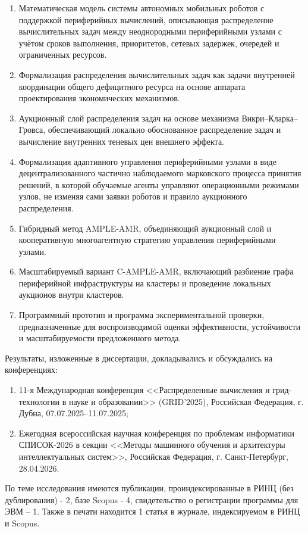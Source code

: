 \begin{enumerate}
    \item Математическая модель системы автономных мобильных роботов с поддержкой периферийных вычислений, описывающая распределение вычислительных задач между неоднородными периферийными узлами с учётом сроков выполнения, приоритетов, сетевых задержек, очередей и ограниченных ресурсов.
	\item Формализация распределения вычислительных задач как задачи внутренней координации общего дефицитного ресурса на основе аппарата проектирования экономических механизмов.
	\item Аукционный слой распределения задач на основе механизма Викри--Кларка--Гровса, обеспечивающий локально обоснованное распределение задач и вычисление внутренних теневых цен внешнего эффекта.
	\item Формализация адаптивного управления периферийными узлами в виде децентрализованного частично наблюдаемого марковского процесса принятия решений, в которой обучаемые агенты управляют операционными режимами узлов, не изменяя сами заявки роботов и правило аукционного распределения.
	\item Гибридный метод AMPLE-AMR, объединяющий аукционный слой и кооперативную многоагентную стратегию управления периферийными узлами.
	\item Масштабируемый вариант C-AMPLE-AMR, включающий разбиение графа периферийной инфраструктуры на кластеры и проведение локальных аукционов внутри кластеров.
	\item Программный прототип и программа экспериментальной проверки, предназначенные для воспроизводимой оценки эффективности, устойчивости и масштабируемости предложенного метода.
\end{enumerate}

\probation Результаты, изложенные в диссертации, докладывались и обсуждались на конференциях:
\begin{enumerate}
	\item 11-я Международная конференция <<Распределенные вычисления и грид-технологии в науке и образовании>> (GRID'2025), Российская Федерация, г. Дубна, 07.07.2025–11.07.2025;
	\item Ежегодная всероссийская научная конференция по проблемам информатики СПИСОК-2026 в секции <<Методы машинного обучения и архитектуры интеллектуальных систем>>, Российская Федерация, г. Санкт-Петербург, 28.04.2026.
\end{enumerate}

\publications По теме исследования имеются публикации, проиндексированные в РИНЦ (без дублирования) - 2, базе Scopus - 4, свидетельство о регистрации программы для ЭВМ – 1. Также в печати находится 1 статья в журнале, индексируемом в РИНЦ и Scopus.


